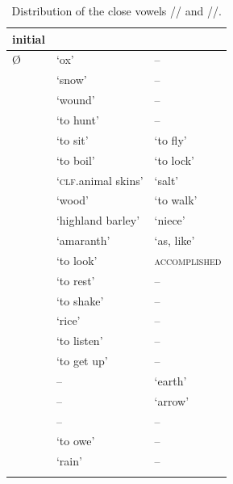 		\begin{table}%
			\caption{Distribution of the close vowels // and //.}
			\begin{tabularx}{\textwidth}{  l@{\hspace{12mm}} Q Q }
				\lsptoprule
				initial &   & \\\midrule
				Ø &  ‘ox’ & --\\
				 &  ‘snow’ & --\\
				 &  ‘wound’ & --\\
				 &  ‘to hunt’ & --\\
				 &  ‘to sit’ &  ‘to fly’\\
				 &  ‘to boil’ &  ‘to lock’\\
				 &  ‘\textsc{clf}.animal skins’ &  ‘salt’\\
				 &  ‘wood’ &  ‘to walk’\\
				 &  ‘highland barley’ &  ‘niece’\\
				 &  ‘amaranth’ &  ‘as, like’\\
				 &  ‘to look’ &  \textsc{accomplished}\\
				 &  ‘to rest’ & --\\
				 &  ‘to shake’ & --\\
				 &  ‘rice’ & --\\
				 &  ‘to listen’ & --\\
				 &  ‘to get up’ & --\\
				 & -- &   ‘earth’\\
				 & -- &   ‘arrow’\\
				 & -- & --\\
				 &  ‘to owe’ & --\\
				 &  ‘rain’ & --\\
				\lspbottomrule
			\end{tabularx}
			\label{tab:ie}
		\end{table}
		
